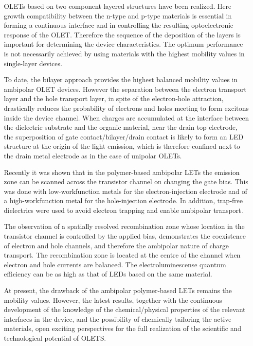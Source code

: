 OLETs based on two component layered structures have been realized. Here growth compatibility between the n-type and p-type materials is essential in forming a continuous interface and in controlling the resulting optoelectronic response of the OLET. Therefore the sequence of the deposition of the layers is important for determining the device characteristics. The optimum performance is not necessarily achieved by using materials with the highest mobility values in single-layer devices. 

To date, the bilayer approach provides the highest balanced mobility values in ambipolar OLET devices. However the separation between the electron transport layer and the hole transport layer, in spite of the electron-hole attraction, drastically reduces the probability of electrons and holes meeting to form excitons inside the device channel. When charges are accumulated at the interface between the dielectric substrate and the organic material, near the drain top electrode, the superposition of gate contact/bilayer/drain contact is likely to form an LED structure at the origin of the light emission, which is therefore confined next to the drain metal electrode as in the case of unipolar OLETs.

Recently it was shown that in the polymer-based ambipolar LETs the emission zone can be scanned across the transistor channel on changing the gate bias. This was done with low-workfunction metals for the electron-injection electrode and of a high-workfunction metal for the hole-injection electrode. In addition, trap-free dielectrics were used to avoid electron trapping and enable ambipolar transport. 

The observation of a spatially resolved recombination zone whose location in the transistor channel is controlled by the applied bias, demonstrates the coexistence of electron and hole channels, and therefore the ambipolar nature of charge transport. The recombination zone is located at the centre of the channel when electron and hole currents are balanced. The electroluminescense quantum efficiency can be as high as that of LEDs based on the same material. 

At present, the drawback of the ambipolar polymer-based LETs remains the mobility values. However, the latest results, together with the continuous development of the knowledge of the chemical/physical properties of the relevant interfaces in the device, and the possibility of chemically tailoring the active materials, open exciting perspectives for the full realization of the scientific and technological potential of OLETS.





